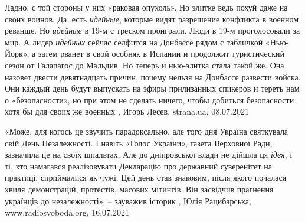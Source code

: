 Ладно, с той стороны у них «раковая опухоль». Но элитке ведь похуй даже на
своих воинов.  Да, есть \emph{идейные}, которые видят разрешение конфликта в
военном реванше.  Но \emph{идейные} в 19-м с треском проиграли. Люди в 19-м
проголосовали за мир.  А лидер \emph{идейных} сейчас селфится на Донбассе рядом
с табличкой «Нью-Йорк», а затем рванет в свой особняк в Испании и продолжит
туристический сезон от Галапагос до Мальдив.  Но теперь и нью-элитка стала
такой же. Она назовет двести девятнадцать причин, почему нельзя на Донбассе
развести войска.  Они каждый день будут выпускать на эфиры прилизанных спикеров
и тереть нам о «безопасности», но при этом не сделать ничего, чтобы добиться
безопасности хотя бы для своих же военных
, 
Игорь Лесев, strana.ua, 08.07.2021

«Може, для когось це звучить парадоксально, але того дня Україна святкувала
свій День Незалежності. І навіть «Голос України», газета Верховної Ради,
зазначила це на своїх шпальтах. Але до дніпровської влади не дійшла ця
\emph{ідея}, і ті, хто намагався реалізовувати Декларацію про державний
суверенітет на практиці, сприймалися як чужі. Цей день став знаковим, після
якого почалася хвиля демонстрацій, протестів, масових мітингів. Він засвідчив
прагнення українців до незалежності», – зауважив історик
, 
Юлія Рацибарська, www.radiosvoboda.org, 16.07.2021

